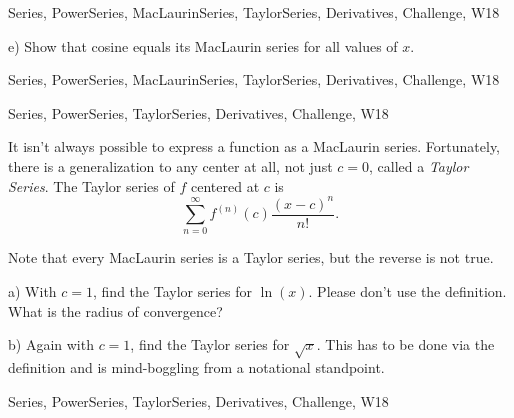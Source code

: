\begin{tagblock}{Series, PowerSeries, MacLaurinSeries, TaylorSeries, Derivatives, Challenge, W18}
\begin{question}
e) Show that cosine equals its MacLaurin series for all values of $x$. 
	
	
\begin{tags}
	    Series, PowerSeries, MacLaurinSeries, TaylorSeries, Derivatives, Challenge, W18
\end{tags}
	
\begin{diary}
	    
\end{diary}
	
\begin{solution}
	   
\end{solution}
	
\end{question}

\end{tagblock}

 

\begin{tagblock}{Series, PowerSeries, TaylorSeries, Derivatives, Challenge, W18}
\begin{question}

It isn't always possible to express a function as a MacLaurin series. Fortunately, there is a generalization to any center at all, not just $c=0$, called a \textit{Taylor Series}. The Taylor series of $f$ centered at $c$ is
\[
\sum_{n=0}^{\infty}f^{(n)}(c)\frac{(x-c)^{n}}{n!}.
\]

\bigskip

Note that every MacLaurin series is a Taylor series, but the reverse is not true.  

\bigskip

a) With $c=1$, find the Taylor series for $\ln(x)$. Please don't use the definition. What is the radius of convergence?

\bigskip

b) Again with $c=1$, find the Taylor series for $\sqrt{x}$. This has to be done via the definition and is mind-boggling from a notational standpoint.
	
	
\begin{tags}
	    Series, PowerSeries, TaylorSeries, Derivatives, Challenge, W18
\end{tags}
	
\begin{diary}
	    
\end{diary}
	
\begin{solution}
	   
\end{solution}
	
\end{question}

\end{tagblock}

